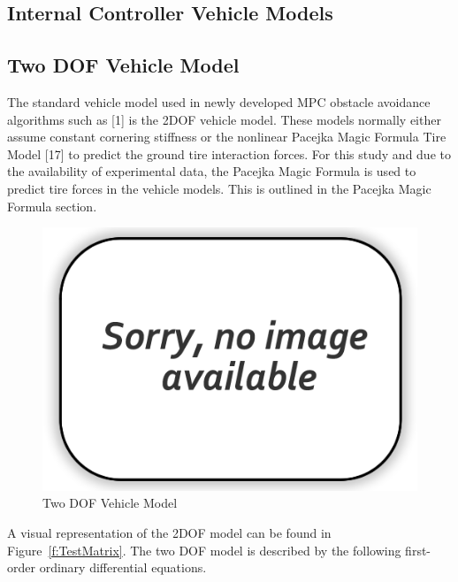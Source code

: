 \documentclass[12pt,twocolumn]{article}
\begin{document}

\subsection{Internal Controller Vehicle Models}\label{ss:IntModel}


\subsection{Two DOF Vehicle Model}\label{ss:2DOFModel}
The standard vehicle model used in newly developed MPC obstacle avoidance algorithms such as [1] is the 2DOF vehicle model. These models normally either assume constant cornering stiffness or the nonlinear Pacejka Magic Formula Tire Model [17] to predict the ground tire interaction forces. For this study and due to the availability of experimental data, the Pacejka Magic Formula is used to predict tire forces in the vehicle models. This is outlined in the Pacejka Magic Formula section.  

\begin{figure}
	\centering
	\includegraphics[width=\columnwidth]{Figs/no-image.png}
	\caption{\small Two DOF Vehicle Model}  
	\label{fig:2DOF}
\end{figure}

A visual representation of the 2DOF model can be found in Figure~\ref{f:TestMatrix}. The two DOF model is described by the following first-order ordinary differential equations.
\end{document}
